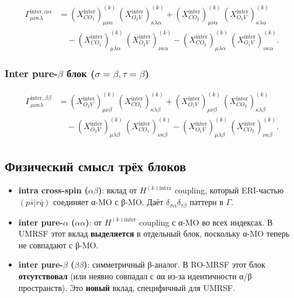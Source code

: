 \documentclass[11pt, a4paper]{article}
\theoremstyle{definition}
\newcommand{\Hkintra}{H^{(k)\text{intra}}}
\newcommand{\Hkinter}{H^{(k)\text{inter}}}
\begin{document}
\begin{equation}
    \begin{aligned}
        \Gamma^{\text{inter},\alpha\alpha}_{\mu\nu\kappa\lambda} &= (X^{\text{inter}}_{CO_1})^{(k)}_{\mu\nu\alpha}\, (X^{\text{inter}}_{O_2 V})^{(k)}_{\kappa\lambda\alpha} + (X^{\text{inter}}_{CO_2})^{(k)}_{\mu\nu\alpha}\, (X^{\text{inter}}_{O_1 V})^{(k)}_{\kappa\lambda\alpha} \\
        &\quad - (X^{\text{inter}}_{CO_1})^{(k)}_{\mu\lambda\alpha}\, (X^{\text{inter}}_{O_2 V})^{(k)}_{\nu\kappa\alpha} - (X^{\text{inter}}_{CO_2})^{(k)}_{\mu\lambda\alpha}\, (X^{\text{inter}}_{O_1 V})^{(k)}_{\nu\kappa\alpha}.
    \end{aligned}
\end{equation}

\subsubsection{Inter pure-$\beta$ блок ($\sigma = \beta, \tau = \beta$)}

\begin{equation}
    \begin{aligned}
        \Gamma^{\text{inter},\beta\beta}_{\mu\nu\kappa\lambda} &= (X^{\text{inter}}_{O_2 V})^{(k)}_{\mu\nu\beta}\, (X^{\text{inter}}_{CO_1})^{(k)}_{\kappa\lambda\beta} + (X^{\text{inter}}_{O_1 V})^{(k)}_{\mu\nu\beta}\, (X^{\text{inter}}_{CO_2})^{(k)}_{\kappa\lambda\beta} \\
        &\quad - (X^{\text{inter}}_{O_2 V})^{(k)}_{\mu\lambda\beta}\, (X^{\text{inter}}_{CO_1})^{(k)}_{\nu\kappa\beta} - (X^{\text{inter}}_{O_1 V})^{(k)}_{\mu\lambda\beta}\, (X^{\text{inter}}_{CO_2})^{(k)}_{\nu\kappa\beta}.
    \end{aligned}
\end{equation}

\subsection{Физический смысл трёх блоков}

\begin{itemize}
    \item \textbf{intra cross-spin ($\alpha\beta$)}: вклад от $\Hkintra$ coupling, который ERI-частью $(p\bar s | r \bar q)$ соединяет α-MO с β-MO. Даёт $\delta_{\sigma\alpha} \delta_{\tau\beta}$ паттерн в $\Gamma$.
    \item \textbf{inter pure-$\alpha$ ($\alpha\alpha$)}: от $\Hkinter$ coupling с α-MO во всех индексах. В UMRSF этот вклад \textbf{выделяется} в отдельный блок, поскольку α-MO теперь не совпадают с β-MO.
    \item \textbf{inter pure-$\beta$ ($\beta\beta$)}: симметричный β-аналог. В RO-MRSF этот блок \textbf{отсутствовал} (или неявно совпадал с αα из-за идентичности α/β пространств). Это \textbf{новый} вклад, специфичный для UMRSF.
\end{itemize}
\end{document}
